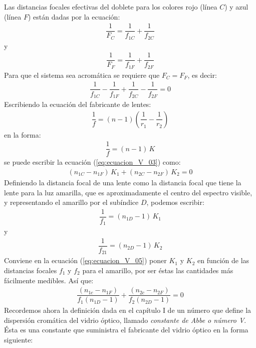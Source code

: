 \documentclass[14pt]{extarticle}
\begin{document}
Las distancias focales efectivas del doblete para los colores rojo (línea $C$) y azul (línea $F$) están dadas por la ecuación:
\begin{align}
\dfrac{1}{F_{C}} = \dfrac{1}{f_{1C}} + \dfrac{1}{f_{2C}}
\label{eq:ecuacion_V_01}
\end{align}
y
\begin{align}
\dfrac{1}{F_{F}} = \dfrac{1}{f_{1F}} + \dfrac{1}{f_{2F}}
\label{eq:ecuacion_V_02}
\end{align}
Para que el sistema sea acromática se requiere que $F_{C} = F_{F}$, es decir:
\begin{align}
\dfrac{1}{f_{1C}} - \dfrac{1}{f_{1F}} + \dfrac{1}{f_{2C}} - \dfrac{1}{f_{2F}} = 0
\label{eq:ecuacion_V_03}
\end{align}
Escribiendo la ecuación del fabricante de lentes:
\begin{align*}
\dfrac{1}{f} = (n - 1) \left( \dfrac{1}{r_{1}} - \dfrac{1}{r_{2}} \right)
\end{align*}
en la forma:
\begin{align}
\dfrac{1}{f} = (n - 1) \, K
\label{eq:ecuacion_V_04}
\end{align}
se puede escribir la ecuación (\ref{eq:ecuacion_V_03}) como:
\begin{align}
(n_{1C} - n_{1F}) \, K_{1} + (n_{2C} - n_{2F}) \, K_{2} = 0
\label{eq:ecuacion_V_05}
\end{align}
Definiendo la distancia focal de una lente como la distancia focal que tiene la lente para la luz amarilla, que es aproximadamente el centro del espectro visible, y representando el amarillo por el subíndice $D$, podemos escribir:
\begin{align}
\dfrac{1}{f_{1}} = \left( n_{1D} - 1 \right) \, K_{1}
\label{eq:ecuacion_V_06}
\end{align}
y
\begin{align}
\dfrac{1}{f_{21}} = \left( n_{2D} - 1 \right) \, K_{2}
\label{eq:ecuacion_V_07}
\end{align}
Conviene en la ecuación (\ref{eq:ecuacion_V_05}) poner $K_{1}$ y $K_{2}$ en función de las distancias focales $f_{1}$ y $f_{2}$ para el amarillo, por ser éstas las cantidades más fácilmente medibles. Así que:
\begin{align}
\dfrac{\left( n_{1c} - n_{1F} \right)}{f_{1} \left( n_{1D} - 1 \right)} + \dfrac{\left( n_{2c} - n_{2F} \right)}{f_{2} \left( n_{2D} - 1 \right)} = 0
\label{eq:ecuacion_V_08}
\end{align}
Recordemos ahora la definición dada en el capítulo I de un número que define la dispersión cromática del vidrio óptico, llamado \textit{constante de Abbe o número V}. Ésta es una constante que suministra el fabricante del vidrio óptico en la forma siguiente:
\end{document}
